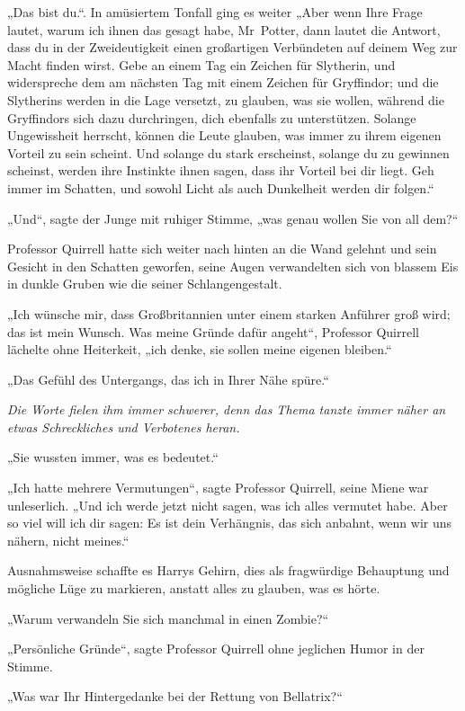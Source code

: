 {„Das bist du.“. In amüsiertem Tonfall ging es weiter „Aber wenn Ihre Frage lautet, warum ich ihnen das gesagt habe, Mr~Potter, dann lautet die Antwort, dass du in der Zweideutigkeit einen großartigen Verbündeten auf deinem Weg zur Macht finden wirst. Gebe an einem Tag ein Zeichen für Slytherin, und widerspreche dem am nächsten Tag mit einem Zeichen für Gryffindor; und die Slytherins werden in die Lage versetzt, zu glauben, was sie wollen, während die Gryffindors sich dazu durchringen, dich ebenfalls zu unterstützen. Solange Ungewissheit herrscht, können die Leute glauben, was immer zu ihrem eigenen Vorteil zu sein scheint. Und solange du stark erscheinst, solange du zu gewinnen scheinst, werden ihre Instinkte ihnen sagen, dass ihr Vorteil bei dir liegt. Geh immer im Schatten, und sowohl Licht als auch Dunkelheit werden dir folgen.“

„Und“, sagte der Junge mit ruhiger Stimme, „was genau wollen Sie von all dem?“

Professor Quirrell hatte sich weiter nach hinten an die Wand gelehnt und sein Gesicht in den Schatten geworfen, seine Augen verwandelten sich von blassem Eis in dunkle Gruben wie die seiner Schlangengestalt.

„Ich wünsche mir, dass Großbritannien unter einem starken Anführer groß wird; das ist mein Wunsch. Was meine Gründe dafür angeht“, Professor Quirrell lächelte ohne Heiterkeit, „ich denke, sie sollen meine eigenen bleiben.“

„Das Gefühl des Untergangs, das ich in Ihrer Nähe spüre.“

\emph{Die Worte fielen ihm immer schwerer, denn das Thema tanzte immer näher an etwas Schreckliches und Verbotenes heran.}

„Sie wussten immer, was es bedeutet.“

„Ich hatte mehrere Vermutungen“, sagte Professor Quirrell, seine Miene war unleserlich. „Und ich werde jetzt nicht sagen, was ich alles vermutet habe. Aber so viel will ich dir sagen: Es ist dein Verhängnis, das sich anbahnt, wenn wir uns nähern, nicht meines.“

Ausnahmsweise schaffte es Harrys Gehirn, dies als fragwürdige Behauptung und mögliche Lüge zu markieren, anstatt alles zu glauben, was es hörte.

„Warum verwandeln Sie sich manchmal in einen Zombie?“

„Persönliche Gründe“, sagte Professor Quirrell ohne jeglichen Humor in der Stimme.

„Was war Ihr Hintergedanke bei der Rettung von Bellatrix?“

}
